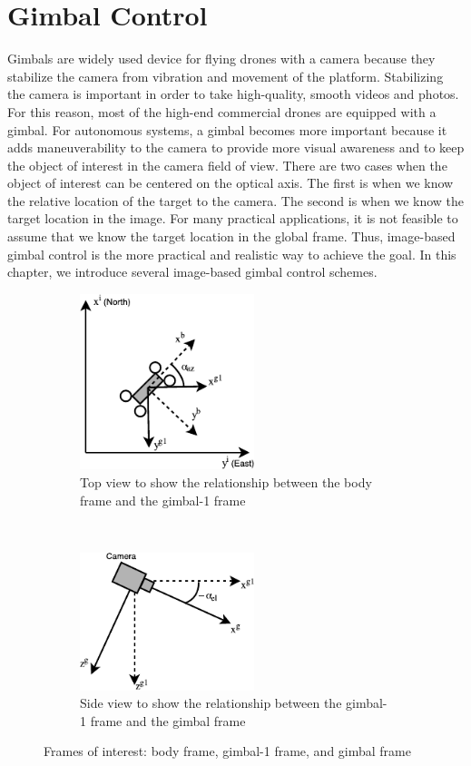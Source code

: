 \chapter{Gimbal Control}
\label{chapter2}
\graphicspath{{figures/}{figures/chapter2/}}
Gimbals are widely used device for flying drones with a camera because they stabilize the camera from vibration and movement of the platform. Stabilizing the camera is important in order to take high-quality, smooth videos and photos. For this reason, most of the high-end commercial drones are equipped with a gimbal. For autonomous systems, a gimbal becomes more important because it adds maneuverability to the camera to provide more visual awareness and to keep the object of interest in the camera field of view. There are two cases when the object of interest can be centered on the optical axis. The first is when we know the relative location of the target to the camera. The second is when we know the target location in the image. For many practical applications, it is not feasible to assume that we know the target location in the global frame. Thus, image-based gimbal control is the more practical and realistic way to achieve the goal. In this chapter, we introduce several image-based gimbal control schemes.

\begin{figure}[htbp]
    \centering
    \begin{subfigure}[t]{0.5\textwidth}
    	\centering
    	\includegraphics[width=2in]{images/chapter2/gimbal1_frame}
    	\caption{Top view to show the relationship between the body frame and the gimbal-1 frame}
    \end{subfigure}%
    ~
    \begin{subfigure}[t]{0.5\textwidth}
    	\centering
    	\includegraphics[width=2in]{images/chapter2/gimbal_frame}
    	\caption{Side view to show the relationship between the gimbal-1 frame and the gimbal frame}
    \end{subfigure}
    \caption{Frames of interest: body frame, gimbal-1 frame, and gimbal frame}
    \label{gimbal_frame}
\end{figure}

